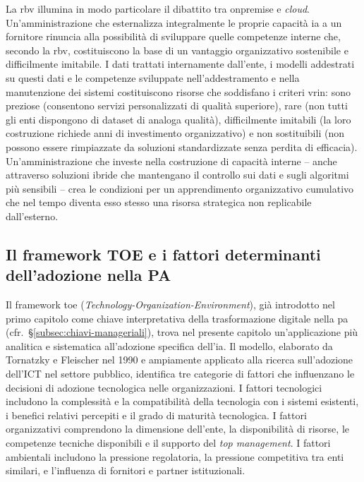 La \gls{rbv} illumina in modo particolare il dibattito tra \gls{onpremise} e \textit{cloud}. Un'amministrazione che esternalizza integralmente le proprie capacità \gls{ia} a un fornitore rinuncia alla possibilità di sviluppare quelle competenze interne che, secondo la \gls{rbv}, costituiscono la base di un vantaggio organizzativo sostenibile e difficilmente imitabile. I dati trattati internamente dall'ente, i modelli addestrati su questi dati e le competenze sviluppate nell'addestramento e nella manutenzione dei sistemi costituiscono risorse che soddisfano i criteri \gls{vrin}: sono preziose (consentono servizi personalizzati di qualità superiore), rare (non tutti gli enti dispongono di dataset di analoga qualità), difficilmente imitabili (la loro costruzione richiede anni di investimento organizzativo) e non sostituibili (non possono essere rimpiazzate da soluzioni standardizzate senza perdita di efficacia). Un'amministrazione che investe nella costruzione di capacità interne -- anche attraverso soluzioni ibride che mantengano il controllo sui dati e sugli algoritmi più sensibili -- crea le condizioni per un apprendimento organizzativo cumulativo che nel tempo diventa esso stesso una risorsa strategica non replicabile dall'esterno.

\subsection{Il framework TOE e i fattori determinanti dell'adozione nella PA}

Il framework \gls{toe} (\textit{Technology-Organization-Environment}), già introdotto nel primo capitolo come chiave interpretativa della trasformazione digitale nella \gls{pa} (cfr.~§\ref{subsec:chiavi-manageriali}), trova nel presente capitolo un'applicazione più analitica e sistematica all'adozione specifica dell'\gls{ia}. Il modello, elaborato da Tornatzky e Fleischer nel 1990 e ampiamente applicato alla ricerca sull'adozione dell'ICT nel settore pubblico, identifica tre categorie di fattori che influenzano le decisioni di adozione tecnologica nelle organizzazioni. I fattori tecnologici includono la complessità e la compatibilità della tecnologia con i sistemi esistenti, i benefici relativi percepiti e il grado di maturità tecnologica. I fattori organizzativi comprendono la dimensione dell'ente, la disponibilità di risorse, le competenze tecniche disponibili e il supporto del \textit{top management}. I fattori ambientali includono la pressione regolatoria, la pressione competitiva tra enti similari, e l'influenza di fornitori e partner istituzionali.

